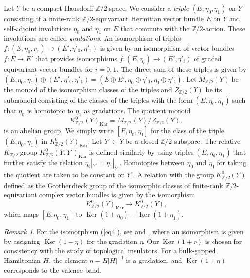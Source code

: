 \documentclass{amsart}
\theoremstyle{plain}
\theoremstyle{definition}
\theoremstyle{remark}
\newtheorem{remark}[theorem]{Remark}
\newcommand{\Z}{\mathbb{Z}}
\newcommand{\Kar}{\mathrm{Kar}}
\DeclareMathOperator{\Ker}{\mathrm{Ker}}
\begin{document}
Let $Y$ be a compact Hausdorff $\Z/2$-space.
We consider a {\em triple} $(E, \eta_0,\eta_1)$ on $Y$ consisting of a finite-rank $\Z/2$-equivariant Hermitian vector bundle $E$ on $Y$ and self-adjoint involutions $\eta_0$ and $\eta_1$ on $E$ that commute with the $\Z/2$-action.
These involutions are called {\em gradations}.
An isomorphism of triples $f \colon (E, \eta_0,\eta_1) \to (E', \eta'_0,\eta'_1)$ is given by an isomorphism of vector bundles $f \colon E \to E'$ that provides isomorphisms $f \colon (E, \eta_i) \to (E', \eta'_i)$ of graded equivariant vector bundles for $i=0,1$.
The direct sum of these triples is given by $(E, \eta_0, \eta_1) \oplus (E', \eta'_0, \eta'_1) = (E \oplus E', \eta_0 \oplus \eta'_0, \eta_1 \oplus \eta'_1)$.
Let $M_{\Z/2}(Y)$ be the monoid of the isomorphism classes of the triples and $Z_{\Z/2}(Y)$ be its submonoid consisting of the classes of the triples with the form $(E, \eta_0, \eta_1)$ such that $\eta_0$ is homotopic to $\eta_1$ as gradations.
The quotient monoid
\begin{equation*}
	K^0_{\Z/2}(Y)_{\Kar} = M_{\Z/2}(Y) / Z_{\Z/2}(Y),
\end{equation*}
is an abelian group.
We simply write $[E, \eta_0, \eta_1]$ for the class of the triple $(E, \eta_0, \eta_1)$ in $K^0_{\Z/2}(Y)_{\Kar}$.
Let $Y' \subset Y$ be a closed $\Z/2$-subspace.
The relative $K_{\Z/2}$-group $K^0_{\Z/2}(Y, Y')_\Kar$ is defined similarly by using triples $(E, \eta_0, \eta_1)$ that further satisfy the relation $\eta_0|_{Y'} = \eta_1|_{Y'}$.
Homotopies between $\eta_0$ and $\eta_1$ for taking the quotient are taken to be constant on $Y'$.
A relation with the group $K^0_{\Z/2}(Y)$ defined as the Grothendieck group of the isomorphic classes of finite-rank $\Z/2$-equivariant complex vector bundles is given by the isomorphism
\begin{equation}
\label{eq4}
	K^0_{\Z/2}(Y)_{\Kar} \to K^0_{\Z/2}(Y),
\end{equation}
which maps $[E, \eta_0, \eta_1]$ to $\Ker(1 + \eta_0) - \Ker(1 + \eta_1)$.

\begin{remark}
\label{rem2.5}
For the isomorphism (\ref{eq4}), see \cite[Chapter~III, Proposition~5.7]{Karoubi78} and \cite[Proposition~4.21]{Gomi23}, where
an isomorphism is given by assigning $\Ker(1-\eta)$ for the gradation $\eta$.
Our $\Ker(1+\eta)$ is chosen for consistency with the study of topological insulators.
For a bulk-gapped Hamiltonian $H$, the element $\eta = H|H|^{-1}$ is a gradation, and $\Ker(1+\eta)$ corresponds to the valence band.
\end{remark}
\end{document}
